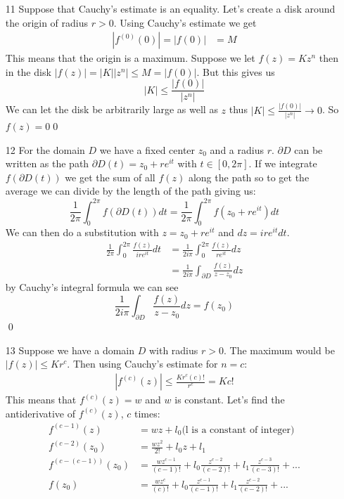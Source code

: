 \documentclass{article}
\begin{document}
  \begin{enumerate}
    \item[11]
      Suppose that Cauchy's estimate is an equality. Let's create a disk around the origin of radius $r>0$. Using Cauchy's estimate we get
      \begin{align*}
        |f^{(0)}(0)|=|f(0)|&=M
      \end{align*}
      This means that the origin is a maximum. Suppose we let $f(z)=Kz^n$ then in the disk $|f(z)|=|K||z^n|\leq M=|f(0)|$. But this gives us
      \[|K|\leq\frac{|f(0)|}{|z^n|}\]
      We can let the disk be arbitrarily large as well as $z$ thus $|K|\leq\frac{|f(0)|}{|z^n|}\to0$. So $f(z)=0$\qed
    \item[12]
      For the domain $D$ we have a fixed center $z_0$ and a radius $r$. $\partial D$ can be written as the path $\partial D(t)=z_0+re^{it}$ with $t\in[0,2\pi]$. If we integrate $f(\partial D(t))$ we get the sum of all $f(z)$ along the path so to get the average we can divide by the length of the path giving us:
      \[
        \frac{1}{2\pi}\int_0^{2\pi}f(\partial D(t))dt=\frac{1}{2\pi}\int_0^{2\pi}f(z_0+re^{it})dt
      \]
      We can then do a substitution with $z=z_0+re^{it}$ and $dz=ire^{it}dt$.
      \begin{align*}
        \frac{1}{2\pi}\int_0^{2\pi}\frac{f(z)}{ire^{it}}dt&=\frac{1}{2i\pi}\int_0^{2\pi}\frac{f(z)}{re^{it}}dz\\
        &=\frac{1}{2i\pi}\int_{\partial D}\frac{f(z)}{z-z_0}dz
      \end{align*}
      by Cauchy's integral formula we can see
      \[\frac{1}{2i\pi}\int_{\partial D}\frac{f(z)}{z-z_0}dz=f(z_0)\]\qed
    \item[13]
      Suppose we have a domain $D$ with radius $r>0$. The maximum would be $|f(z)|\leq Kr^c$. Then using Cauchy's estimate for $n=c$:
      \begin{align*}
        |f^{(c)}(z)|\leq\frac{Kr^c(c)!}{r^c}=Kc!
      \end{align*}
      This means that $f^{(c)}(z)=w$ and $w$ is constant. Let's find the antiderivative of $f^{(c)}(z)$, $c$ times:
      \begin{align*}
        f^{(c-1)}(z)&=wz+l_0\text{(l is a constant of integer)}\\
        f^{(c-2)}(z_0)&=\frac{wz^2}{2!}+l_0z+l_1\\
        f^{(c-(c-1))}(z_0)&=\frac{wz^{c-1}}{(c-1)!}+l_0\frac{z^{c-2}}{(c-2)!}+l_1\frac{z^{c-3}}{(c-3)!}+...\\
        f(z_0)&=\frac{wz^{c}}{(c)!}+l_0\frac{z^{c-1}}{(c-1)!}+l_1\frac{z^{c-2}}{(c-2)!}+...

\end{align*}
\end{enumerate}
\end{document}
